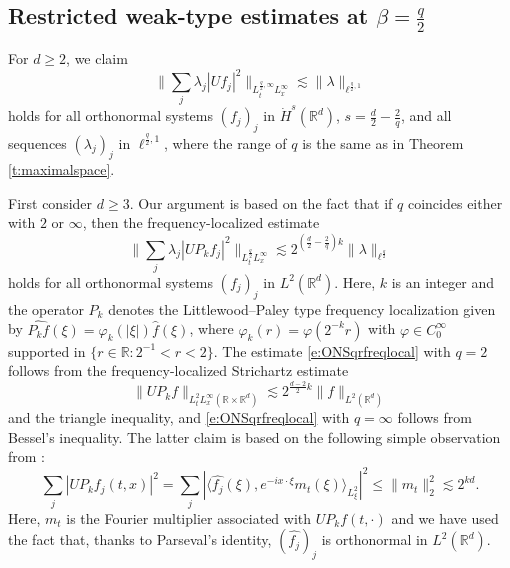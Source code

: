 \documentclass[a4paper]{amsart}
\numberwithin{equation}{section}%
\theoremstyle{plain}%
\theoremstyle{definition}
\theoremstyle{remark}%
\begin{document}
 \subsection{Restricted weak-type estimates at $\beta = \frac{q}{2}$} \label{subsection:motivation}
For $d\ge2$, we claim
\begin{equation}\label{i:weak-restricted}
\bigg\|\sum_j\lambda_j|Uf_j|^2\bigg\|_{L_t^{\frac q2,\infty}L_x^\infty}
\lesssim 
\|\lambda\|_{\ell^{\frac q2,1}}
\end{equation}
holds for all orthonormal systems $(f_j)_j$ in $\dot{H}^s(\mathbb R^d)$, $s = \frac{d}{2} - \frac{2}{q}$, and all sequences $(\lambda_j)_j$ in $\ell^{\frac q2,1}$, where the range of $q$ is the same as in Theorem \ref{t:maximalspace}. 

First consider $d \geq 3$. Our argument is based on the fact that if $q$ coincides either with $2$ or $\infty$, then the frequency-localized estimate
\begin{equation} \label{e:ONSqrfreqlocal}
\bigg\| \sum_j \lambda_j |UP_kf_j|^2 \bigg\|_{L^{\frac{q}{2}}_tL^\infty_x} \lesssim 2^{(\frac{d}{2} - \frac{2}{q})k}\| \lambda \|_{\ell^\frac{q}{2}}
\end{equation}
holds for all orthonormal systems $(f_j)_j$ in $L^2(\mathbb R^d)$. Here, $k$ is an integer and the operator $P_k$ denotes the Littlewood--Paley type frequency localization given by $\widehat{P_k f}(\xi)=\varphi_k(|\xi|)\widehat{f}(\xi)$, where $\varphi_k(r)=\varphi(2^{-k}r)$ with $\varphi\in C_0^\infty$ supported in $\{r \in\mathbb R:2^{-1}< r <2\}$. The estimate \eqref{e:ONSqrfreqlocal} with $q = 2$ follows from the frequency-localized Strichartz estimate
\begin{equation} \label{e:classicaltopleft}
\|UP_kf\|_{L^2_tL^\infty_x(\mathbb{R} \times \mathbb{R}^d)} \lesssim 2^{\frac{d-2}{2}k} \|f\|_{L^2(\mathbb{R}^d)}
\end{equation}
and the triangle inequality, and \eqref{e:ONSqrfreqlocal} with $q = \infty$ follows from Bessel's inequality. The latter claim is based on the following simple observation from \cite{BHLNS}:
\[
\sum_j |UP_kf_j(t,x)|^2 =  \sum_j |\langle \widehat{f_j}(\xi), e^{-ix \cdot \xi} m_t(\xi) \rangle_{L^2_\xi}|^2 \leq \|m_t\|_2^2 \lesssim 2^{kd}. 
\]
Here, $m_t$ is the Fourier multiplier  associated with $UP_kf(t,\cdot)$ and we have used the fact that, thanks to Parseval's identity, $(\widehat{f_j})_j$ is orthonormal in $L^2(\mathbb{R}^d)$.
\end{document}
